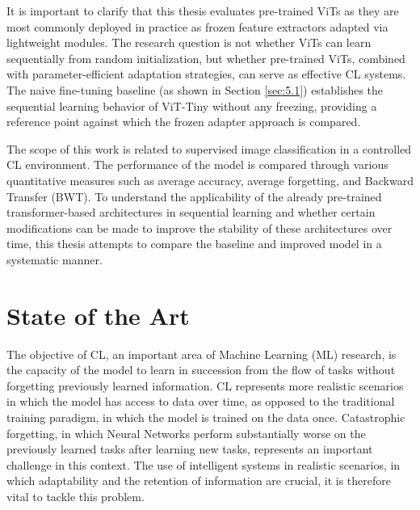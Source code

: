 \documentclass[english, LaM, oneside]{sapthesis}%
\numberwithin{equation}{chapter}
\begin{document}
It is important to clarify that this thesis evaluates pre-trained ViTs as they are most commonly deployed in practice as frozen feature extractors adapted via lightweight modules. The research question is not whether ViTs can learn sequentially from random initialization, but whether pre-trained ViTs, combined with parameter-efficient adaptation strategies, can serve as effective CL systems. The naive fine-tuning baseline (as shown in Section \ref{sec:5.1}) establishes the sequential learning behavior of ViT-Tiny without any freezing, providing a reference point against which the frozen adapter approach is compared.

The scope of this work is related to supervised image classification in a controlled CL environment. The performance of the model is compared through various quantitative measures such as average accuracy, average forgetting, and Backward Transfer (BWT). To understand the applicability of the already pre-trained transformer-based architectures in sequential learning and whether certain modifications can be made to improve the stability of these architectures over time, this thesis attempts to compare the baseline and improved model in a systematic manner.
\section{State of the Art}
\label{sec:1.2}
The objective of CL, an important area of Machine Learning (ML) research\cite{6}, is the capacity of the model to learn in succession from the flow of tasks without forgetting previously learned information.  CL represents more realistic scenarios in which the model has access to data over time, as opposed to the traditional training paradigm, in which the model is trained on the data once. Catastrophic forgetting, in which Neural Networks perform substantially worse on the previously learned tasks after learning new tasks, represents an important challenge in this context. The use of intelligent systems in realistic scenarios, in which adaptability and the retention of information are crucial, it is therefore vital to tackle this problem.
\end{document}
